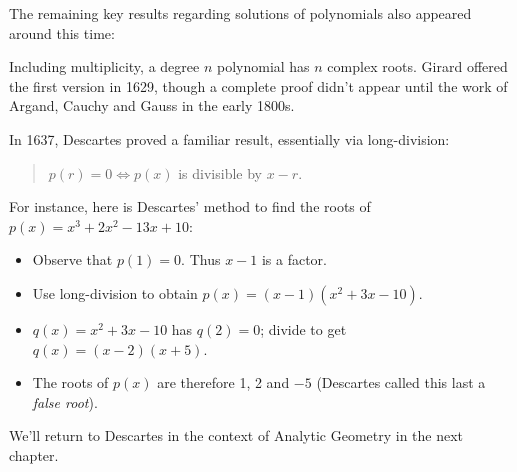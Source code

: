 The remaining key results regarding solutions of polynomials also appeared around this time:
\begin{description}\label{pg:factorthm}
	\item[Fundamental Theorem of Algebra] Including multiplicity, a degree $n$ polynomial has $n$ complex roots. Girard offered the first version in 1629, though a complete proof didn't appear until the work of Argand, Cauchy and Gauss in the early 1800s.
	\item[Factor Theorem] In 1637, Descartes proved a familiar result, essentially via long-division:
	\begin{quote}
		$p(r)=0\iff p(x)$ is divisible by $x-r$.
	\end{quote}
	For instance, here is Descartes' method to find the roots of $p(x)=x^3+2x^2-13x+10$:
	\begin{itemize}
	  \item Observe that $p(1)=0$. Thus $x-1$ is a factor.
	  \item Use long-division to obtain $p(x)=(x-1)(x^2+3x-10)$.
	  \item $q(x)=x^2+3x-10$ has $q(2)=0$; divide to get $q(x)=(x-2)(x+5)$.
	  \item The roots of $p(x)$ are therefore 1, 2 and $-5$ (Descartes called this last a \emph{false root}).
	\end{itemize}
	We'll return to Descartes in the context of Analytic Geometry in the next chapter.
\end{description}


